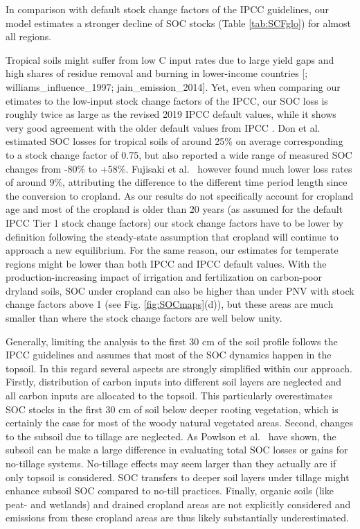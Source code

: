 \documentclass[gc, manuscript]{copernicus}
\begin{document}
In comparison with default stock change factors of the IPCC guidelines, our model estimates a stronger decline of SOC stocks (Table \ref{tab:SCFglo}) for almost all regions.

Tropical soils might suffer from low C input rates due to large yield gaps \citep{global_yieldgap_2022} and high shares of residue removal and burning in lower-income countries {[}\citet{smil_crop_1999}; williams\_influence\_1997; jain\_emission\_2014{]}. Yet, even when comparing our etimates to the low-input stock change factors of the IPCC, our SOC loss is roughly twice as large as the revised 2019 IPCC default values, while it shows very good agreement with the older default values from IPCC \citeyearpar{lasco_cropland_in_ipcc_2006}.
Don et al.~\citeyearpar{don_impact_2011} estimated SOC losses for tropical soils of around 25\% on average corresponding to a stock change factor of 0.75, but also reported a wide range of measured SOC changes from -80\% to +58\%. Fujisaki et al.~\citeyearpar{fujisaki_forest_2015} however found much lower loss rates of around 9\%, attributing the difference to the different time period length since the conversion to cropland. As our results do not specifically account for cropland age and most of the cropland is older than 20 years (as assumed for the default IPCC Tier 1 stock change factors) our stock change factors have to be lower by definition following the steady-state assumption that cropland will continue to approach a new equilibrium. For the same reason, our estimates for temperate regions might be lower than both IPCC \citeyearpar{lasco_cropland_in_ipcc_2006} and IPCC \citeyearpar{ogle_cropland_in_ipcc_2019} default values.
With the production-increasing impact of irrigation and fertilization on carbon-poor dryland soils, SOC under cropland can also be higher than under PNV with stock change factors above 1 (see Fig. \ref{fig:SOCmaps}(d)), but these areas are much smaller than where the stock change factors are well below unity.

Generally, limiting the analysis to the first 30 cm of the soil profile follows the IPCC guidelines \citep{eggleston_ipcc_2006, calvo_buendia_ipcc_2019} and assumes that most of the SOC dynamics happen in the topsoil. In this regard several aspects are strongly simplified within our approach. Firstly, distribution of carbon inputs into different soil layers are neglected and all carbon inputs are allocated to the topsoil. This particularly overestimates SOC stocks in the first 30 cm of soil below deeper rooting vegetation, which is certainly the case for most of the woody natural vegetated areas. Second, changes to the subsoil due to tillage are neglected. As Powlson et al.~\citeyearpar{powlson_limited_2014} have shown, the subsoil can be make a large difference in evaluating total SOC losses or gains for no-tillage systems. No-tillage effects may seem larger than they actually are if only topsoil is considered. SOC transfers to deeper soil layers under tillage might enhance subsoil SOC compared to no-till practices. Finally, organic soils (like peat- and wetlands) and drained cropland areas are not explicitly considered and emissions from these cropland areas are thus likely substantially underestimated.
\end{document}
